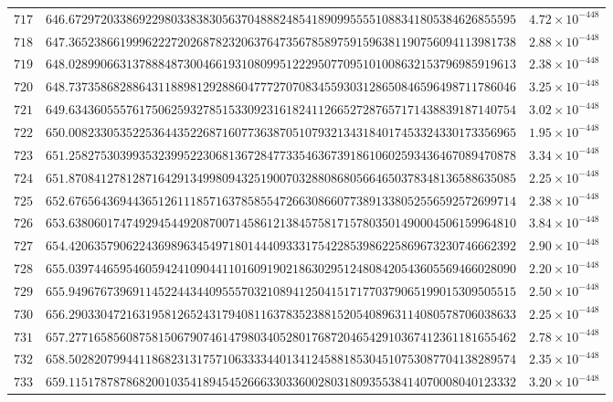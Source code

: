 \documentclass[12pt,reqno]{amsart}
\theoremstyle{remark}
\begin{document}
\begin{longtable}{clc}
$717$ & $646.6729720338692298033838305637048882485418909955551088341805384626855595$ & $4.72\times 10^{-448}$ \\
$718$ & $647.3652386619996222720268782320637647356785897591596381190756094113981738$ & $2.88\times 10^{-448}$ \\
$719$ & $648.0289906631378884873004661931080995122295077095101008632153796985919613$ & $2.38\times 10^{-448}$ \\
$720$ & $648.7373586828864311889812928860477727070834559303128650846596498711786046$ & $3.25\times 10^{-448}$ \\
$721$ & $649.6343605557617506259327851533092316182411266527287657171438839187140754$ & $3.02\times 10^{-448}$ \\
$722$ & $650.0082330535225364435226871607736387051079321343184017453324330173356965$ & $1.95\times 10^{-448}$ \\
$723$ & $651.2582753039935323995223068136728477335463673918610602593436467089470878$ & $3.34\times 10^{-448}$ \\
$724$ & $651.8708412781287164291349980943251900703288086805664650378348136588635085$ & $2.25\times 10^{-448}$ \\
$725$ & $652.6765643694436512611185716378585547266308660773891338052556592572699714$ & $2.38\times 10^{-448}$ \\
$726$ & $653.6380601747492945449208700714586121384575817157803501490004506159964810$ & $3.84\times 10^{-448}$ \\
$727$ & $654.4206357906224369896345497180144409333175422853986225869673230746662392$ & $2.90\times 10^{-448}$ \\
$728$ & $655.0397446595460594241090441101609190218630295124808420543605569466028090$ & $2.20\times 10^{-448}$ \\
$729$ & $655.9496767396911452244344095557032108941250415171770379065199015309505515$ & $2.50\times 10^{-448}$ \\
$730$ & $656.2903304721631958126524317940811637835238815205408963114080578706038633$ & $2.25\times 10^{-448}$ \\
$731$ & $657.2771658560875815067907461479803405280176872046542910367412361181655462$ & $2.78\times 10^{-448}$ \\
$732$ & $658.5028207994411868231317571063333440134124588185304510753087704138289574$ & $2.35\times 10^{-448}$ \\
$733$ & $659.1151787878682001035418945452666330336002803180935538414070008040123332$ & $3.20\times 10^{-448}$ \\

\end{longtable}
\end{document}
